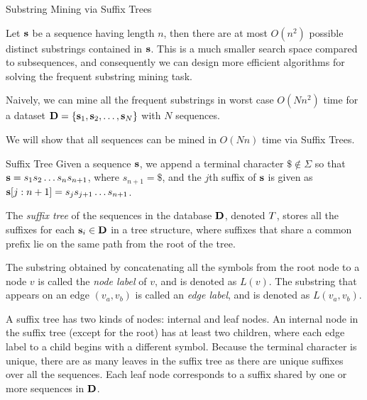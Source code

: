 \begin{frame}{Substring Mining via Suff\/{i}x Trees}

  Let $\mathbf{s}$ be a sequence having length $n$, then
there are at most $O(n^2)$ possible distinct
substrings contained in $\mathbf{s}$. This is a much smaller search space compared to subsequences, and
consequently we can design more eff\/{i}cient algorithms for solving
the frequent substring mining task. 

\bigskip
Naively, we can mine all the
frequent substrings in worst case $O(Nn^2)$ time for a dataset
$\mathbf{D}=\{\mathbf{s}_1, \mathbf{s}_2, \ldots, \mathbf{s}_N\}$ with $N$ sequences.

\bigskip
We will show that all sequences can be mined in $O(Nn)$ time via Suffix
Trees.
\end{frame}



\begin{frame}{Suff\/{i}x Tree}
Given a sequence $\mathbf{s}$, we append a terminal character 
$\$ \not\in \Sigma$ so that
$\mathbf{s} = s_{1}s_{2} \dots s_{n}s_{n+1}$, where $s_{n+1}=\$$, and
the $j$th suff\/{i}x of $\mathbf{s}$ is given as
$\mathbf{s}[j:n+1] = s_{j}s_{j+1} \dots s_{n+1}$.

\medskip
The {\em suff\/{i}x tree} of the sequences in the database $\mathbf{D}$,
denoted ${\relax T}$,
 stores all the
suff\/{i}xes for each $\mathbf{s}_i \in \mathbf{D}$ in a tree structure, where suff\/{i}xes
that share a common pref\/{i}x lie on the same path from the root of the
tree.

\medskip
The substring obtained by
concatenating all the symbols from the root node to a node $v$ is
called the {\em node label} of $v$, and is denoted as $L(v)$.
The substring
that appears on an edge $(v_a,v_b)$ is called an {\em edge label},
and is denoted as $L(v_a,v_b)$.

\medskip
A suff\/{i}x
tree has two kinds of nodes: internal and leaf nodes.  An internal
node in the suff\/{i}x tree (except for the root) has at least two children,
where each edge label to a child begins with a different symbol.  Because
the terminal character is unique, there are as many leaves in the
suff\/{i}x tree as there are unique suff\/{i}xes over all the sequences.
Each leaf node corresponds to a suff\/{i}x shared by one or
more sequences in $\mathbf{D}$.
\end{frame}


